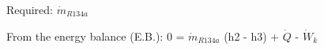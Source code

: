 Required: \( \dot{m}_{R134a} \)  

From the energy balance (E.B.):  
0 = \( \dot{m}_{R134a} \) (h2 - h3) + \( \dot{Q} \) - \( \dot{W}_k \)